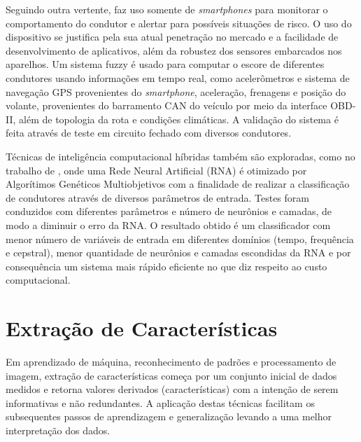 Seguindo outra vertente,  faz uso somente de \textit{smartphones} para monitorar o comportamento do condutor e alertar para possíveis situações de risco. O uso do dispositivo se justifica pela sua atual penetração no mercado e a facilidade de desenvolvimento de aplicativos, além da robustez dos sensores embarcados nos aparelhos. Um sistema fuzzy é usado para computar o escore de diferentes condutores usando informações em tempo real, como acelerômetros e sistema de navegação GPS provenientes do \textit{smartphone}, aceleração, frenagens e posição do volante, provenientes do barramento CAN do veículo por meio da interface OBD-II, além de topologia da rota e condições climáticas. A validação do sistema é feita através de teste em circuito fechado com diversos condutores.

Técnicas de inteligência computacional híbridas também são exploradas, como no trabalho de , onde uma Rede Neural Artificial (RNA) é otimizado por Algorítimos Genéticos Multiobjetivos com a finalidade de realizar a classificação de condutores através de diversos parâmetros de entrada. Testes foram conduzidos com diferentes parâmetros e número de neurônios e camadas, de modo a diminuir o erro da RNA. O resultado obtido é um classificador com menor número de variáveis de entrada em diferentes domínios (tempo, frequência e cepstral), menor quantidade de neurônios e camadas escondidas da RNA e por consequência um sistema mais rápido eficiente no que diz respeito ao custo computacional.


\section{Extração de Características}

Em aprendizado de máquina, reconhecimento de padrões e processamento de imagem, extração de características começa por um conjunto inicial de dados medidos e retorna valores derivados (características) com a intenção de serem informativas e não redundantes. A aplicação destas técnicas facilitam os subsequentes passos de aprendizagem e generalização levando a uma melhor interpretação dos dados. 

